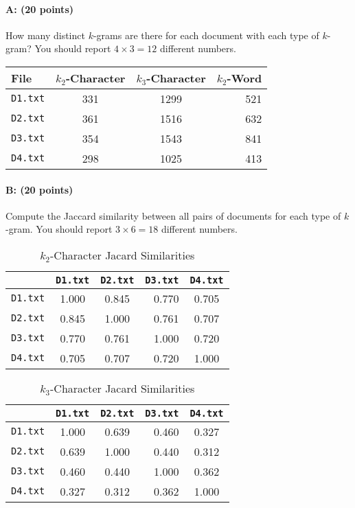 \documentclass[11pt]{article}
\begin{document}
\paragraph{A: (20 points)}  How many distinct $k$-grams are there for each document with each type of $k$-gram?    You should report $4 \times 3 = 12$ different numbers.  

\begin{table}[H]
\centering
\begin{tabular}{lccr}
\hline\hline
{\bf File} & {\bf $k_{2}$-Character} & {\bf $k_{3}$-Character} & {\bf $k_{2}$-Word}\\
\hline
{\tt D1.txt} & 331 & 1299 & 521\\
{\tt D2.txt} & 361 & 1516 & 632\\
{\tt D3.txt} & 354 & 1543 & 841\\
{\tt D4.txt} & 298 & 1025 & 413\\
\hline\hline
\end{tabular}
\end{table}

\paragraph{B: (20 points)}  Compute the Jaccard similarity between all pairs of documents for each type of $k$-gram.  You should report $3 \times 6 = 18$ different numbers.  

\begin{table}[H]
\centering
\caption{$k_{2}$-Character Jacard Similarities}
\begin{tabular}{l|ccrc}
\hline\hline
& {\tt D1.txt} &{\tt D2.txt} &{\tt D3.txt} &{\tt D4.txt} \\
\hline
{\tt D1.txt} &1.000& 0.845& 0.770& 0.705\\
{\tt D2.txt} &0.845& 1.000& 0.761& 0.707\\
{\tt D3.txt} &0.770& 0.761& 1.000& 0.720\\
{\tt D4.txt} &0.705& 0.707& 0.720& 1.000\\
\hline\hline
\end{tabular}
\end{table}


\begin{table}[H]
\centering
\caption{$k_{3}$-Character Jacard Similarities}
\begin{tabular}{l|ccrc}
\hline\hline
& {\tt D1.txt} &{\tt D2.txt} &{\tt D3.txt} &{\tt D4.txt} \\
\hline
{\tt D1.txt} &1.000& 0.639& 0.460& 0.327\\
{\tt D2.txt} &0.639& 1.000& 0.440& 0.312\\
{\tt D3.txt} &0.460& 0.440& 1.000& 0.362\\
{\tt D4.txt} &0.327& 0.312& 0.362& 1.000\\
\hline\hline
\end{tabular}
\end{table}
\end{document}
